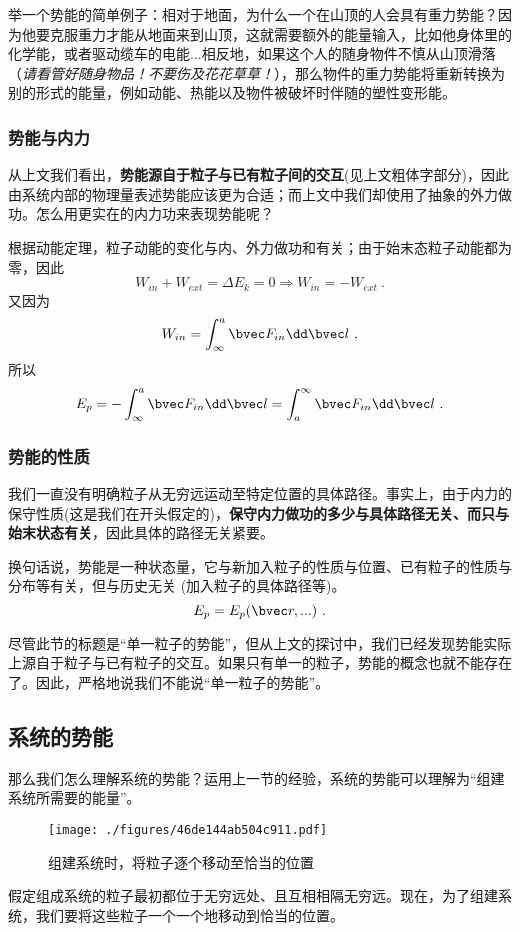 举一个势能的简单例子：相对于地面，为什么一个在山顶的人会具有重力势能？因为他要克服重力才能从地面来到山顶，这就需要额外的能量输入，比如他身体里的化学能，或者驱动缆车的电能...相反地，如果这个人的随身物件不慎从山顶滑落（\textsl{请看管好随身物品！不要伤及花花草草！}），那么物件的重力势能将重新转换为别的形式的能量，例如动能、热能以及物件被破坏时伴随的塑性变形能。

\subsubsection{势能与内力}
从上文我们看出，\textbf{势能源自于粒子与已有粒子间的交互}(见上文粗体字部分)，因此由系统内部的物理量表述势能应该更为合适；而上文中我们却使用了抽象的外力做功。怎么用更实在的内力功来表现势能呢？

根据动能定理，粒子动能的变化与内、外力做功和有关；由于始末态粒子动能都为零，因此
$$W_{in} + W_{ext} = \Delta E_k = 0 \Rightarrow W_{in} = -W_{ext}~.$$
又因为
$$W_{in} = \int^a_\infty \bvec F_{in} \dd \bvec l~, $$
所以
$$E_p = - \int^a_\infty \bvec F_{in} \dd \bvec l = \int^\infty_a \bvec F_{in} \dd \bvec l~.$$

\subsubsection{势能的性质}
我们一直没有明确粒子从无穷远运动至特定位置的具体路径。事实上，由于内力的保守性质(这是我们在开头假定的)，\textbf{保守内力做功的多少与具体路径无关、而只与始末状态有关}，因此具体的路径无关紧要。%

换句话说，势能是一种状态量，它与新加入粒子的性质与位置、已有粒子的性质与分布等有关，但与历史无关 (加入粒子的具体路径等)。
$$E_p=E_p(\bvec r,...)~.$$

尽管此节的标题是“单一粒子的势能”，但从上文的探讨中，我们已经发现势能实际上源自于粒子与已有粒子的交互。如果只有单一的粒子，势能的概念也就不能存在了。因此，严格地说我们不能说“单一粒子的势能”。

\subsection{系统的势能}
那么我们怎么理解系统的势能？运用上一节的经验，系统的势能可以理解为“组建系统所需要的能量”。

\begin{figure}[ht]
\centering
\texttt{[image: ./figures/46de144ab504c911.pdf]}
\caption{组建系统时，将粒子逐个移动至恰当的位置} \label{fig_POTENT_2}
\end{figure}
假定组成系统的粒子最初都位于无穷远处、且互相相隔无穷远。现在，为了组建系统，我们要将这些粒子一个一个地移动到恰当的位置。

